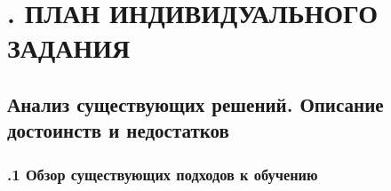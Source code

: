 \sectionbreak \section*{
  \gostTitleFont
  . ПЛАН ИНДИВИДУАЛЬНОГО ЗАДАНИЯ
}

\subsection*{
  \gostTitleFont
   Анализ существующих решений. Описание достоинств и недостатков
}

\titlespace

\subsubsection*{ 
  \gostTitleFont
  .1 Обзор существующих подходов к обучению
} 

\subtitlespace

